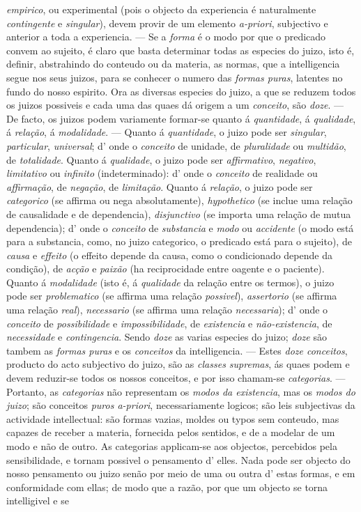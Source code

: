 \emph{empirico}, ou experimental (pois o objecto da experiencia é naturalmente \emph{contingente} e \emph{singular}), devem provir de um elemento \emph{a-priori}, subjectivo e anterior a toda a experiencia. --- Se a \emph{forma} é o modo por que o predicado convem ao sujeito, é claro que basta determinar todas as especies do juizo, isto é, definir, abstrahindo do conteudo ou da materia, as normas, que a intelligencia segue nos seus juizos, para se conhecer o numero das \emph{formas puras}, latentes no fundo do nosso espirito. Ora as diversas especies do juizo, a que se reduzem todos os juizos possiveis e cada uma das quaes dá origem a um \emph{conceito}, são \emph{doze}. --- De facto, os juizos podem variamente formar-se quanto á \emph{quantidade}, á \emph{qualidade}, á \emph{relação}, á \emph{modalidade}. --- Quanto á \emph{quantidade}, o juizo pode ser \emph{singular}, \emph{particular}, \emph{universal}; d' onde o \emph{conceito} de unidade, de \emph{pluralidade} ou \emph{multidão}, de \emph{totalidade}. Quanto á \emph{qualidade}, o juizo pode ser \emph{affirmativo}, \emph{negativo}, \emph{limitativo} ou \emph{infinito} (indeterminado): d' onde o \emph{conceito} de realidade ou \emph{affirmação}, de \emph{negação}, de \emph{limitação}. Quanto á \emph{relação}, o juizo pode ser \emph{categorico} (se affirma ou nega absolutamente), \emph{hypothetico} (se inclue uma relação de causalidade e de dependencia), \emph{disjunctivo} (se importa uma relação de mutua dependencia); d' onde o \emph{conceito} de \emph{substancia} e \emph{modo} ou \emph{accidente} (o modo está para a substancia, como, no juizo categorico, o predicado está para o sujeito), de \emph{causa} e \emph{effeito} (o effeito depende da causa, como o condicionado depende da condição), de \emph{acção} e \emph{paixão} (ha reciprocidade entre oagente e o paciente). Quanto á \emph{modalidade} (isto é, á \emph{qualidade} da relação entre os termos), o juizo pode ser \emph{problematico} (se affirma uma relação \emph{possivel}), \emph{assertorio} (se affirma uma relação \emph{real}), \emph{necessario} (se affirma uma relação \emph{necessaria}); d' onde o \emph{conceito} de \emph{possibilidade} e \emph{impossibilidade}, de \emph{existencia} e \emph{não-existencia}, de \emph{necessidade} e \emph{contingencia}. Sendo \emph{doze} as varias especies do juizo; \emph{doze} são tambem as \emph{formas puras} e os \emph{conceitos} da intelligencia. --- Estes \emph{doze conceitos}, producto do acto subjectivo do juizo, são as \emph{classes supremas}, ás quaes podem e devem reduzir-se todos os nossos conceitos, e por isso chamam-se \emph{categorias}. --- Portanto, as \emph{categorias} não representam os \emph{modos da existencia}, mas os \emph{modos do juizo}; são conceitos \emph{puros a-priori}, necessariamente logicos; são leis subjectivas da actividade intellectual: são formas vazias, moldes ou typos sem conteudo, mas capazes de receber a materia, fornecida pelos sentidos, e de a modelar de um modo e não de outro. As categorias applicam-se aos objectos, percebidos pela sensibilidade, e tornam possivel o pensamento d' elles. Nada pode ser objecto do nosso pensamento ou juizo senão por meio de uma ou outra d' estas formas, e em conformidade com ellas; de modo que a razão, por que um objecto se torna intelligivel e se 